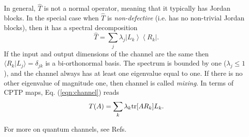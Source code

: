 \documentclass[a4paper,11pt]{article}
\newcommand{\bra}[1]{\left\langle #1 \right|}
\newcommand{\ket}[1]{\left|#1\right\rangle}
\newcommand{\1}{\mathbbm{1}}
\newcommand{\tr}{{\rm tr}}
\begin{document}
In general, $\hat{T}$ is not a normal operator, meaning that it typically has Jordan blocks. In the special case when $\hat{T}$ is \textit{non-defective} (i.e. has no non-trivial Jordan blocks), then it has a spectral decomposition
\begin{equation}\label{eqn:channel2}
\hat{T}=\sum_j \lambda_j \ket{L_k}\bra{R_k}.
\end{equation}
If the input and output dimensions of the channel are the same then $\langle R_k | L_j\rangle =\delta_{jk}$ is a bi-orthonormal basis. The spectrum is bounded by one ($\lambda_j\leq 1$), and the channel always has at least one eigenvalue equal to one. If there is no other eigenvalue of magnitude one, then channel is called \textit{mixing}. In terms of CPTP maps, Eq. (\ref{eqn:channel}) reads
\begin{equation}
T(A)= \sum_k \lambda_k \tr[ A R_k]L_k.
\end{equation}

For more on quantum channels, see Refs. \cite{Nielsen2011,Wolf2012}

\end{document}
